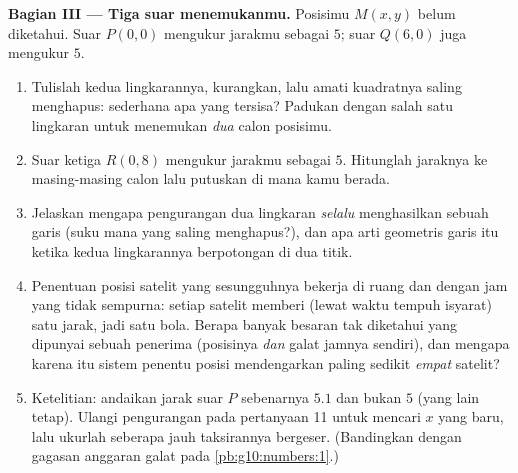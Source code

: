 \begin{problem}
\medskip
\noindent\textbf{Bagian III --- Tiga suar menemukanmu.}
Posisimu $M(x, y)$ belum diketahui. Suar $P(0, 0)$ mengukur
jarakmu sebagai $5$; suar $Q(6, 0)$ juga mengukur $5$.
\begin{enumerate}[resume]
  \item Tulislah kedua  lingkarannya, kurangkan, lalu amati
        kuadratnya saling menghapus:  sederhana apa yang tersisa?
        Padukan dengan salah satu lingkaran untuk menemukan \emph{dua}
        calon posisimu.
  \item Suar ketiga $R(0, 8)$ mengukur jarakmu sebagai $5$.
        Hitunglah jaraknya ke masing-masing calon lalu putuskan di mana
        kamu berada.
  \item Jelaskan mengapa pengurangan dua  lingkaran
        \emph{selalu} menghasilkan  sebuah garis (suku mana
        yang saling menghapus?), dan apa arti geometris garis itu ketika
        kedua lingkarannya berpotongan di dua titik.
  \item Penentuan posisi satelit yang sesungguhnya bekerja di ruang dan
        dengan jam yang tidak sempurna: setiap satelit memberi (lewat waktu
        tempuh isyarat) satu jarak, jadi satu bola. Berapa banyak besaran
        tak diketahui yang dipunyai sebuah penerima (posisinya \emph{dan}
        galat jamnya sendiri), dan mengapa karena itu sistem penentu posisi
        mendengarkan paling sedikit \emph{empat} satelit?
  \item Ketelitian: andaikan jarak suar $P$ sebenarnya
        $5.1$ dan bukan $5$ (yang lain tetap). Ulangi
        pengurangan pada pertanyaan 11 untuk mencari $x$ yang baru, lalu
        ukurlah seberapa jauh taksirannya bergeser. (Bandingkan dengan
        gagasan anggaran galat pada \cref{pb:g10:numbers:1}.)
\end{enumerate}


\end{problem}
